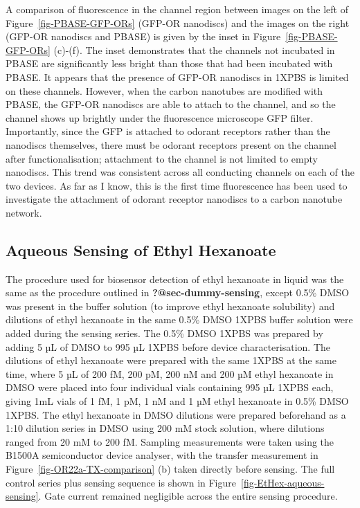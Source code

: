 \documentclass[
  a4paper,
]{scrbook}
\begin{document}
A comparison of fluorescence in the channel region between images on the
left of Figure~\ref{fig-PBASE-GFP-ORs} (GFP-OR nanodiscs) and the images
on the right (GFP-OR nanodiscs and PBASE) is given by the inset in
Figure~\ref{fig-PBASE-GFP-ORs} (c)-(f). The inset demonstrates that the
channels not incubated in PBASE are significantly less bright than those
that had been incubated with PBASE. It appears that the presence of
GFP-OR nanodiscs in 1XPBS is limited on these channels. However, when
the carbon nanotubes are modified with PBASE, the GFP-OR nanodiscs are
able to attach to the channel, and so the channel shows up brightly
under the fluorescence microscope GFP filter. Importantly, since the GFP
is attached to odorant receptors rather than the nanodiscs themselves,
there must be odorant receptors present on the channel after
functionalisation; attachment to the channel is not limited to empty
nanodiscs. This trend was consistent across all conducting channels on
each of the two devices. As far as I know, this is the first time
fluorescence has been used to investigate the attachment of odorant
receptor nanodiscs to a carbon nanotube network.

\hypertarget{sec-EtHex-aqueous-sensing}{%
\subsection{Aqueous Sensing of Ethyl
Hexanoate}\label{sec-EtHex-aqueous-sensing}}

The procedure used for biosensor detection of ethyl hexanoate in liquid
was the same as the procedure outlined in \textbf{?@sec-dummy-sensing},
except 0.5\% DMSO was present in the buffer solution (to improve ethyl
hexanoate solubility) and dilutions of ethyl hexanoate in the same 0.5\%
DMSO 1XPBS buffer solution were added during the sensing series. The
0.5\% DMSO 1XPBS was prepared by adding 5 µL of DMSO to 995 µL 1XPBS
before device characterisation. The dilutions of ethyl hexanoate were
prepared with the same 1XPBS at the same time, where 5 µL of 200 fM, 200
pM, 200 nM and 200 µM ethyl hexanoate in DMSO were placed into four
individual vials containing 995 µL 1XPBS each, giving 1mL vials of 1 fM,
1 pM, 1 nM and 1 µM ethyl hexanoate in 0.5\% DMSO 1XPBS. The ethyl
hexanoate in DMSO dilutions were prepared beforehand as a 1:10 dilution
series in DMSO using 200 mM stock solution, where dilutions ranged from
20 mM to 200 fM. Sampling measurements were taken using the B1500A
semiconductor device analyser, with the transfer measurement in
Figure~\ref{fig-OR22a-TX-comparison} (b) taken directly before sensing.
The full control series plus sensing sequence is shown in
Figure~\ref{fig-EtHex-aqueous-sensing}. Gate current remained negligible
across the entire sensing procedure.
\end{document}
